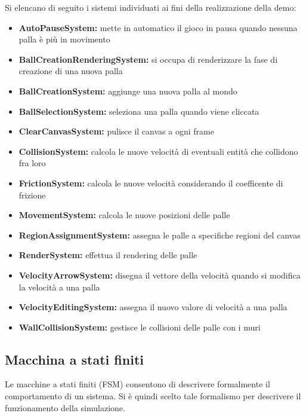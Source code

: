 Si elencano di seguito i sistemi individuati ai fini della realizzazione della demo:
\begin{itemize}
    \item \textbf{AutoPauseSystem:} mette in automatico il gioco in pausa quando nessuna palla è più in movimento
    \item \textbf{BallCreationRenderingSystem:} si occupa di renderizzare la fase di creazione di una nuova palla
    \item \textbf{BallCreationSystem:} aggiunge una nuova palla al mondo
    \item \textbf{BallSelectionSystem:} seleziona una palla quando viene cliccata
    \item \textbf{ClearCanvasSystem:} pulisce il canvas a ogni frame
    \item \textbf{CollisionSystem:} calcola le nuove velocità di eventuali entità che collidono fra loro
    \item \textbf{FrictionSystem:} calcola le nuove velocità considerando il coefficente di frizione
    \item \textbf{MovementSystem:} calcola le nuove posizioni delle palle
    \item \textbf{RegionAssignmentSystem:} assegna le palle a specifiche regioni del canvas
    \item \textbf{RenderSystem:} effettua il rendering delle palle
    \item \textbf{VelocityArrowSystem:} disegna il vettore della velocità quando si modifica la velocità a una palla
    \item \textbf{VelocityEditingSystem:} assegna il nuovo valore di velocità a una palla
    \item \textbf{WallCollisionSystem:} gestisce le collisioni delle palle con i muri
\end{itemize}

\subsection{Macchina a stati finiti}\label{subsec:macchina-a-stati-finiti}
Le macchine a stati finiti (FSM) consentono di descrivere formalmente il comportamento di un sistema.
Si è quindi scelto tale formalismo per descrivere il funzionamento della simulazione.

